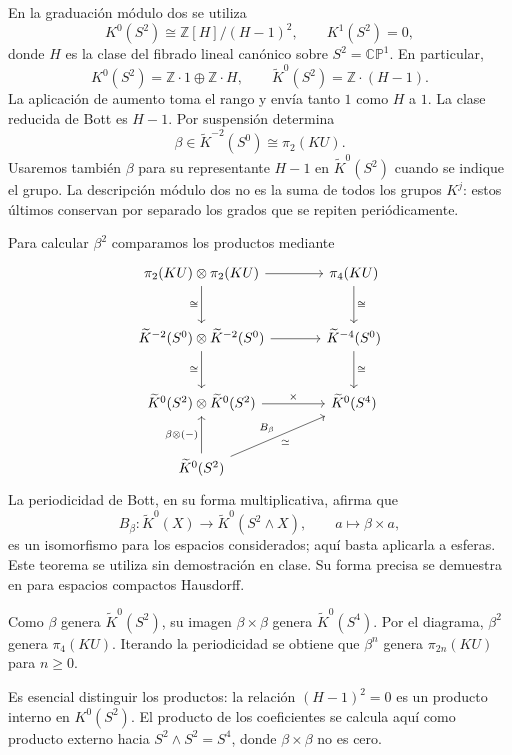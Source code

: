 En la graduación módulo dos se utiliza
\[
K^0(S^2)\cong\mathbb Z[H]/(H-1)^2,
\qquad K^1(S^2)=0,
\]
donde $H$ es la clase del fibrado lineal canónico sobre $S^2=\mathbb{CP}^1$. En particular,
\[
K^0(S^2)=\mathbb Z\cdot1\oplus\mathbb Z\cdot H,
\qquad\widetilde K^0(S^2)=\mathbb Z\cdot(H-1).
\]
La aplicación de aumento toma el rango y envía tanto $1$ como $H$ a $1$. La clase reducida de Bott es $H-1$. Por suspensión determina
\[
\beta\in\widetilde K^{-2}(S^0)\cong\pi_2(KU).
\]
Usaremos también $\beta$ para su representante $H-1$ en $\widetilde K^0(S^2)$ cuando se indique el grupo. La descripción módulo dos no es la suma de todos los grupos $K^j$: estos últimos conservan por separado los grados que se repiten periódicamente.

Para calcular $\beta^2$ comparamos los productos mediante
\[
\begin{tikzcd}[column sep=large,row sep=large]
\pi_2(KU)\otimes\pi_2(KU)\arrow[r]\arrow[d,"\cong"']&\pi_4(KU)\arrow[d,"\cong"]\\
\widetilde K^{-2}(S^0)\otimes\widetilde K^{-2}(S^0)\arrow[r]\arrow[d,"\cong"']&
\widetilde K^{-4}(S^0)\arrow[d,"\cong"]\\
\widetilde K^0(S^2)\otimes\widetilde K^0(S^2)\arrow[r,"\times"]&\widetilde K^0(S^4)\\
\widetilde K^0(S^2)\arrow[u,"\beta\otimes(-)"]\arrow[ur,"B_\beta","\simeq"']&
\end{tikzcd}
\]
La periodicidad de Bott, en su forma multiplicativa, afirma que
\[
B_\beta\colon\widetilde K^0(X)\longrightarrow\widetilde K^0(S^2\wedge X),
\qquad a\longmapsto\beta\times a,
\]
es un isomorfismo para los espacios considerados; aquí basta aplicarla a esferas. Este teorema se utiliza sin demostración en clase. Su forma precisa se demuestra en \cite[teorema~2.11]{hatcher2017vbkt} para espacios compactos Hausdorff.

Como $\beta$ genera $\widetilde K^0(S^2)$, su imagen $\beta\times\beta$ genera $\widetilde K^0(S^4)$. Por el diagrama, $\beta^2$ genera $\pi_4(KU)$. Iterando la periodicidad se obtiene que $\beta^n$ genera $\pi_{2n}(KU)$ para $n\geq0$.

Es esencial distinguir los productos: la relación $(H-1)^2=0$ es un producto interno en $K^0(S^2)$. El producto de los coeficientes se calcula aquí como producto externo hacia $S^2\wedge S^2=S^4$, donde $\beta\times\beta$ no es cero.

